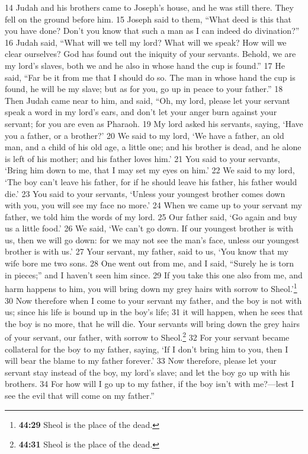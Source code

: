 {14} Judah and his brothers came to Joseph's house, and he was still
there. They fell on the ground before him. {15} Joseph said to them,
``What deed is this that you have done? Don't you know that such a man
as I can indeed do divination?'' {16} Judah said, ``What will we tell my
lord? What will we speak? How will we clear ourselves? God has found out
the iniquity of your servants. Behold, we are my lord's slaves, both we
and he also in whose hand the cup is found.'' {17} He said, ``Far be it
from me that I should do so. The man in whose hand the cup is found, he
will be my slave; but as for you, go up in peace to your father.'' {18}
Then Judah came near to him, and said, ``Oh, my lord, please let your
servant speak a word in my lord's ears, and don't let your anger burn
against your servant; for you are even as Pharaoh. {19} My lord asked
his servants, saying, `Have you a father, or a brother?' {20} We said to
my lord, `We have a father, an old man, and a child of his old age, a
little one; and his brother is dead, and he alone is left of his mother;
and his father loves him.' {21} You said to your servants, `Bring him
down to me, that I may set my eyes on him.' {22} We said to my lord,
`The boy can't leave his father, for if he should leave his father, his
father would die.' {23} You said to your servants, `Unless your youngest
brother comes down with you, you will see my face no more.' {24} When we
came up to your servant my father, we told him the words of my lord.
{25} Our father said, `Go again and buy us a little food.' {26} We said,
`We can't go down. If our youngest brother is with us, then we will go
down: for we may not see the man's face, unless our youngest brother is
with us.' {27} Your servant, my father, said to us, `You know that my
wife bore me two sons. {28} One went out from me, and I said, ``Surely
he is torn in pieces;'' and I haven't seen him since. {29} If you take
this one also from me, and harm happens to him, you will bring down my
grey hairs with sorrow to Sheol.'\footnote{\textbf{44:29} Sheol is the
  place of the dead.} {30} Now therefore when I come to your servant my
father, and the boy is not with us; since his life is bound up in the
boy's life; {31} it will happen, when he sees that the boy is no more,
that he will die. Your servants will bring down the grey hairs of your
servant, our father, with sorrow to Sheol.\footnote{\textbf{44:31} Sheol
  is the place of the dead.} {32} For your servant became collateral for
the boy to my father, saying, `If I don't bring him to you, then I will
bear the blame to my father forever.' {33} Now therefore, please let
your servant stay instead of the boy, my lord's slave; and let the boy
go up with his brothers. {34} For how will I go up to my father, if the
boy isn't with me?---lest I see the evil that will come on my father.''

